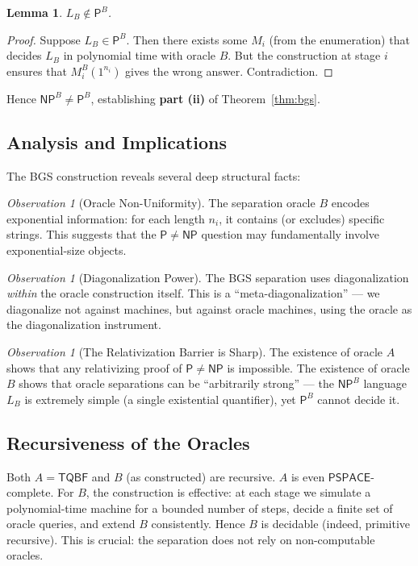 \documentclass[11pt,a4paper]{article}
\theoremstyle{plain}
\newtheorem{lemma}[theorem]{Lemma}
\theoremstyle{definition}
\theoremstyle{remark}
\newtheorem{observation}[theorem]{Observation}
\newcommand{\PP}{\mathsf{P}}
\newcommand{\NP}{\mathsf{NP}}
\newcommand{\PSPACE}{\mathsf{PSPACE}}
\newcommand{\TQBF}{\mathsf{TQBF}}
\begin{document}
\begin{lemma}\label{lem:LB_not_in_PB}
$L_B \notin \PP^B$.
\end{lemma}
\begin{proof}
Suppose $L_B \in \PP^B$.  Then there exists some $M_i$ (from the enumeration)
that decides $L_B$ in polynomial time with oracle $B$.  But the construction at
stage $i$ ensures that $M_i^B(1^{n_i})$ gives the wrong answer.  Contradiction.
\end{proof}

Hence $\NP^B \neq \PP^B$, establishing \textbf{part (ii)} of
Theorem~\ref{thm:bgs}.

\subsection{Analysis and Implications}

The BGS construction reveals several deep structural facts:

\begin{observation}[Oracle Non-Uniformity]
The separation oracle $B$ encodes exponential information: for each length $n_i$,
it contains (or excludes) specific strings.  This suggests that the
$\PP \neq \NP$ question may fundamentally involve exponential-size objects.
\end{observation}

\begin{observation}[Diagonalization Power]
The BGS separation uses diagonalization \emph{within} the oracle construction
itself.  This is a ``meta-diagonalization'' — we diagonalize not against
machines, but against oracle machines, using the oracle as the diagonalization
instrument.
\end{observation}

\begin{observation}[The Relativization Barrier is Sharp]
The existence of oracle $A$ shows that any relativizing proof of $\PP \neq \NP$
is impossible.  The existence of oracle $B$ shows that oracle separations can
be ``arbitrarily strong'' — the $\NP^B$ language $L_B$ is extremely simple
(a single existential quantifier), yet $\PP^B$ cannot decide it.
\end{observation}

\subsection{Recursiveness of the Oracles}

Both $A = \TQBF$ and $B$ (as constructed) are recursive.  $A$ is even
$\PSPACE$-complete.  For $B$, the construction is effective: at each stage we
simulate a polynomial-time machine for a bounded number of steps, decide a
finite set of oracle queries, and extend $B$ consistently.  Hence $B$ is
decidable (indeed, primitive recursive).  This is crucial: the separation does
not rely on non-computable oracles.
\end{document}
